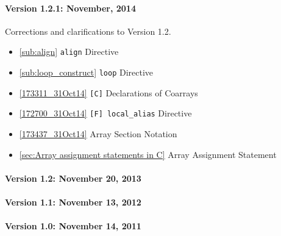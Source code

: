 \paragraph*{Version 1.2.1: November, 2014} Corrections and
clarifications to Version 1.2.

\begin{itemize}
  \item \ref{sub:align} {\tt align} Directive
  \item \ref{sub:loop_construct} {\tt loop} Directive
  \item \ref{173311_31Oct14} {\tt [C]} Declarations of Coarrays
  \item \ref{172700_31Oct14} {\tt [F] local\_alias} Directive
  \item \ref{173437_31Oct14} Array Section Notation
  \item \ref{sec:Array assignment statements in C} Array Assignment Statement
\end{itemize}

\paragraph*{Version 1.2: November 20, 2013}

\paragraph*{Version 1.1: November 13, 2012}

\paragraph*{Version 1.0: November 14, 2011}
